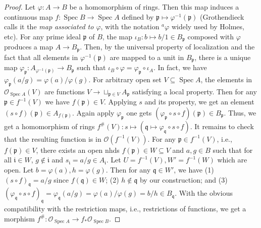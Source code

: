 \documentclass[12pt,letter]{article}
\newcommand{\Spec}[0]{\operatorname{Spec}}
\begin{document}
	\begin{proof}
	Let $\varphi: A\to B$ be a homomorphism of rings. Then this map induces a continuous map $f:\Spec B\to\Spec A$ defined by $\mathfrak p\mapsto\varphi^{-1}(\mathfrak p)$ (Grothendieck calls it the \textit{map associated to $\varphi$}, with the notation $^a\varphi$ widely used by Holmes, etc). For any prime ideal $\mathfrak p$ of $B$, the map $\iota_B:b\mapsto b/1\in B_{\mathfrak p}$ composed with $\varphi$ produces a map $A\to B_{\mathfrak p}$. Then, by the universal property of localization and the fact that all elements in $\varphi^{-1}(\mathfrak p)$ are mapped to a unit in $B_{\mathfrak p}$, there is a unique map $\varphi_{\mathfrak p}: A_{\varphi^{-1}(\mathfrak p)}\to B_{\mathfrak p}$ such that $\iota_B\circ\varphi=\varphi_{\mathfrak p}\circ\iota_A$. In fact, we have $\varphi_{\mathfrak p}(a/g)=\varphi(a)/\varphi(g)$. For arbitrary open set $V\subseteq \Spec A$, the elements in $\mathscr O_{\Spec A}(V)$ are functions $V\to \sqcup_{\mathfrak p\in V}A_{\mathfrak p}$ satisfying a local property. Then for any $\mathfrak p\in f^{-1}(V)$ we have $f(\mathfrak p)\in V$. Applying $s$ and its property, we get an element $(s\circ f)(\mathfrak p)\in A_{f(\mathfrak p)}$. Again apply $\varphi_{\mathfrak p}$ one gets $(\varphi_{\mathfrak p}\circ s\circ f)(\mathfrak p)\in B_{\mathfrak p}$. Thus, we get a homomorphism of rings $f^\#(V):s\mapsto (\mathfrak q\mapsto\varphi_{\mathfrak q}\circ s\circ f)$. It remains to check that the resulting function is in $\mathscr O(f^{-1}(V))$. For any $\mathfrak p\in f^{-1}(V)$, i.e., $f(\mathfrak p)\in V$, there exists an open nhds $f(\mathfrak p)\in W\subseteq V$ and $a, g\in B$ such that for all $\mathfrak i\in W$, $g\notin \mathfrak i$ and $s_{\mathfrak i}=a/g\in A_{\mathfrak i}$. Let $U=f^{-1}(V), W'=f^{-1}(W)$ which are open. Let $b=\varphi(a), h=\varphi(g)$. Then for any $\mathfrak q\in W'$, we have (1) $(s\circ f)_{\mathfrak q}=a/g$ since $f(\mathfrak q)\in W$; (2) $h\notin \mathfrak q$ by our construction; and (3) $(\varphi_{\mathfrak q}\circ s\circ f)_{\mathfrak q}=\varphi_{\mathfrak q}(a/g)=\varphi(a)/\varphi(g)=b/h\in B_{\mathfrak q}$. With the obvious compatibility with the restriction maps, i.e., restrictions of functions, we get a morphism $f^\#:\mathscr O_{\Spec A}\to f_*\mathscr O_{\Spec B}$.
	

\end{proof}
\end{document}
